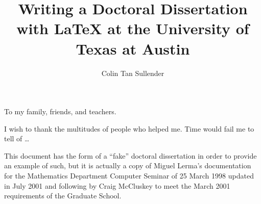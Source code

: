 \documentclass[12pt]{report}
\author{Colin Tan Sullender}
\title{Writing a Doctoral Dissertation with \LaTeX{} at the University of Texas at Austin}
\begin{document}
\copyrightpage      %
\commcertpage       %
\titlepage          %


\begin{dedication}
To my family, friends, and teachers.
\end{dedication}


\begin{acknowledgments}
I wish to thank the multitudes of people who helped me. Time would
fail me to tell of \ldots
\end{acknowledgments}


\utabstract
\indent
This document has the form of a ``fake'' doctoral dissertation in order to provide an example of such, but it is actually a
copy of Miguel Lerma's documentation for the Mathematics Department Computer Seminar of 25 March 1998 updated in July 2001
and following by Craig McCluskey to meet the March 2001 requirements of the Graduate School.


\tableofcontents
\listoftables
\listoffigures






\appendices






\end{document}
